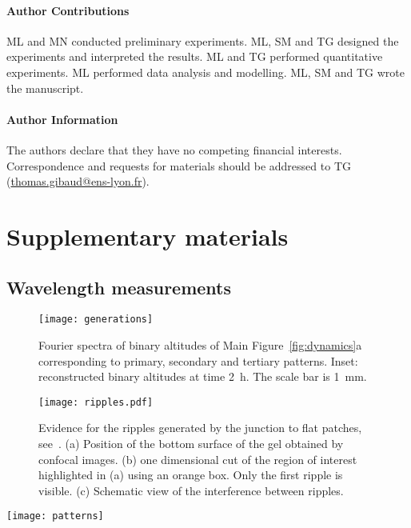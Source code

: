 \documentclass[twocolumn,superscriptaddress,showpacs,preprintnumbers,
amsmath,amssymb,prl]{revtex4-1}
\begin{document}
\paragraph*{Author Contributions}
ML and MN conducted preliminary experiments. ML, SM and TG designed the experiments and interpreted the results. ML and TG performed quantitative experiments. ML performed data analysis and modelling. ML, SM and TG wrote the manuscript.


\paragraph*{Author Information} 
The authors declare that they have no competing financial interests. 
Correspondence and requests for materials should be addressed to TG (\href{mailto:thomas.gibaud@ens-lyon.fr}{thomas.gibaud@ens-lyon.fr}).






\clearpage
\newpage
\setcounter{figure}{0}

\section*{Supplementary materials}

\subsection*{Wavelength measurements}

\begin{figure}
	\texttt{[image: generations]}%
	\caption{Fourier spectra of binary altitudes of Main Figure~\ref{fig:dynamics}a corresponding to primary, secondary and tertiary patterns. Inset: reconstructed binary altitudes at time \SI{2}{\hour}. The scale bar is \SI{1}{\milli\metre}.}%
	\label{fig:generations}%
\end{figure}

\begin{figure}
\texttt{[image: ripples.pdf]}
\caption{Evidence for the ripples generated by the junction to flat patches, see~\cite{LeGoff2014}. (a) Position of the bottom surface of the gel obtained by confocal images. (b) one dimensional cut of the region of interest highlighted in (a) using an orange box. Only the first ripple is visible. (c) Schematic view of the interference between ripples.}
\label{fig:ripples}
\end{figure}

\begin{figure*}
	\texttt{[image: patterns]}
	\caption{Patterns corresponding to the samples of Supplementary Table~\ref{tab:data}. (a-d) increasing cell thickness. (e-f) larger solid content. (g-i) increasing glycerol content. All pictures are stitching of fluorescent microscopy images except (c,e) which are details of reflected light macroscope images. The scale is common to all panels (scale bar \SI{1}{\milli\metre}). Arrows show the measured primary wavelength.}
	\label{fig:patterns}
\end{figure*}
\end{document}

